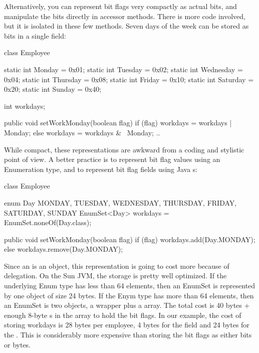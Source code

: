 Alternatively, you can represent bit flags very compactly as actual bits, and
manipulate the bits directly in accessor methods. There is more code involved,
but it is isolated in these few methods. Seven days of the week can be stored as
bits in a single field:

\begin{shortlisting}
	class Employee {
	
		static int Monday = 0x01;
		static int Tuesday = 0x02;
		static int Wednesday = 0x04;
		static int Thursday = 0x08;
		static int Friday = 0x10;
		static int Saturday = 0x20;
		static int Sunday = 0x40;
		
		int workdays;
		
		public void setWorkMonday(boolean flag) {
			if (flag) {
				workdays = workdays | Monday;
			} else {
				workdays = workdays & ~Monday;
			}
		}
		..
   }
		       
\end{shortlisting}

While compact, these representations are awkward from a coding and
stylistic point of view. A better practice is to represent bit flag values
using an Enumeration type, and to represent bit flag fields using Java
s:
\begin{shortlisting}

    class Employee {
 
		enum Day {MONDAY, TUESDAY, WEDNESDAY, THURSDAY, FRIDAY, SATURDAY, SUNDAY}
    	EnumSet<Day> workdays = EnumSet.noneOf(Day.class);
    
   	 	public void setWorkMonday(boolean flag) {
			if (flag) {
				workdays.add(Day.MONDAY);
			} else {
				workdays.remove(Day.MONDAY);
			}
		}
	}
    
    
\end{shortlisting}

Since an  is an object, this representation is going to
cost more because of delegation. On the Sun JVM, the storage is pretty
well optimized. If the underlying Enum type has less than 64 elements, then an
EnumSet is represented by one object of size 24 bytes. If the Enym type has more
than 64 elements, then an EnumSet is two objects, a wrapper plus a
 array. The total cost is 40 bytes + enough 8-byte s
in the array to hold the bit flags. In our example, the cost of storing workdays is 28 bytes per employee, 4 bytes
for the field and 24 bytes for the . This is considerably
more expensive than storing the bit flags as either bits or bytes. 

